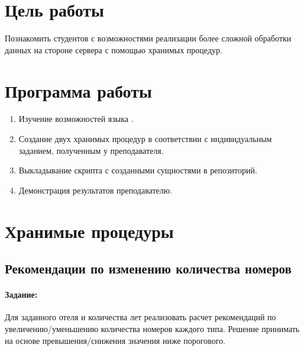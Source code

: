 





\tableofcontents
\newpage

\section{Цель работы}

Познакомить студентов с возможностями реализации более сложной обработки данных на стороне сервера с помощью хранимых процедур.

\section{Программа работы}

\begin{enumerate}
	\item Изучение возможностей языка .
	\item Создание двух хранимых процедур в соответствии с индивидуальным заданием, полученным у преподавателя.
	\item Выкладывание скрипта с созданными сущностями в репозиторий.
	\item Демонстрация результатов преподавателю.
\end{enumerate}

\section{Хранимые процедуры}

\subsection{Рекомендации по изменению количества номеров}

\paragraph{Задание:} Для заданного отеля и количества лет реализовать расчет рекомендаций по увеличению/уменьшению количества номеров каждого типа. Решение принимать на основе превышения/снижения значения ниже порогового.

